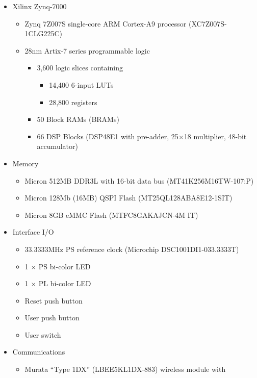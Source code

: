 \begin{itemize}
\item Xilinx Zynq-7000
%
\begin{itemize}
\item Zynq 7Z007S single-core ARM Cortex-A9 processor (XC7Z007S-1CLG225C)
\item 28nm Artix-7 series programmable logic
\begin{itemize}
\item 3,600 logic slices containing~\cite{Xilinx_UG585_2021}
\begin{itemize}
\item 14,400 6-input LUTs
\item 28,800 registers
\end{itemize}
\item 50 Block RAMs (BRAMs)
\item 66 DSP Blocks (DSP48E1 with pre-adder, 25$\times$18 multiplier, 48-bit accumulator)
\end{itemize}
\end{itemize}
%
\item Memory
%
\begin{itemize}
\item Micron 512MB DDR3L with 16-bit data bus (MT41K256M16TW-107:P)
\item Micron 128Mb (16MB) QSPI Flash (MT25QL128ABA8E12-1SIT)
\item Micron 8GB eMMC Flash (MTFC8GAKAJCN-4M IT)
\end{itemize}
%
\item Interface I/O
%
\begin{itemize}
\item 33.3333MHz PS reference clock (Microchip DSC1001DI1-033.3333T)
\item 1 $\times$ PS bi-color LED
\item 1 $\times$ PL bi-color LED
\item Reset push button
\item User push button
\item User switch
\end{itemize}
%
\item Communications
%
\begin{itemize}
\item Murata ``Type 1DX'' (LBEE5KL1DX-883) wireless module with
\begin{itemize}

\end{itemize}
\end{itemize}
\end{itemize}

